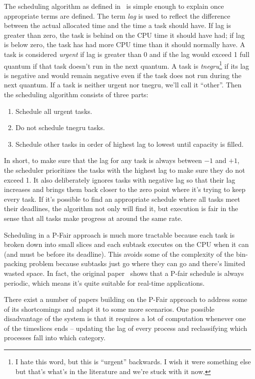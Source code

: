 The scheduling algorithm as defined in~\cite{pfair} is simple enough to explain once appropriate terms are defined. The term \textit{lag} is used to reflect the difference between the actual allocated time and the time a task should have. If lag is greater than zero, the task is behind on the CPU time it should have had; if lag is below zero, the task has had more CPU time than it should normally have.  A task is considered \textit{urgent} if lag is greater than 0 and if the lag would exceed 1 full quantum if that task doesn't run in the next quantum. A task is \textit{tnegru}\footnote{I hate this word, but this is ``urgent'' backwards. I wish it were something else but that's what's in the literature and we're stuck with it now.} if its lag is negative and would remain negative even if the task does not run during the next quantum. If a task is neither urgent nor tnegru, we'll call it ``other''. Then the scheduling algorithm consists of three parts:
\begin{enumerate}
	\item Schedule all urgent tasks.
	\item Do not schedule tnegru tasks.
	\item Schedule other tasks in order of highest lag to lowest until capacity is filled.
\end{enumerate}

In short, to make sure that the lag for any task is always between $-1$ and $+1$, the scheduler prioritizes the tasks with the highest lag to make sure they do not exceed 1. It also deliberately ignores tasks with negative lag so that their lag increases and brings them back closer to the zero point where it's trying to keep every task. If it's possible to find an appropriate schedule where all tasks meet their deadlines, the algorithm not only will find it, but execution is fair in the sense that all tasks make progress at around the same rate.

Scheduling in a P-Fair approach is much more tractable because each task is broken down into small slices and each subtask executes on the CPU when it can (and must be before its deadline). This avoids some of the complexity of the bin-packing problem because subtasks just go where they can go and there's limited wasted space. In fact, the original paper~\cite{pfair} shows that a P-fair schedule is always periodic, which means it's quite suitable for real-time applications.

There exist a number of papers building on the P-Fair approach to address some of its shortcomings and adapt it to some more scenarios. One possible disadvantage of the system is that it requires a lot of computation whenever one of the timeslices ends -- updating the lag of every process and reclassifying which processes fall into which category. 


